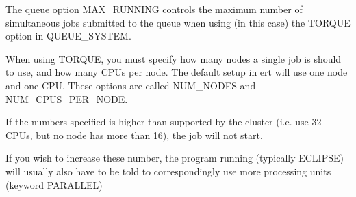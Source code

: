 \documentclass[a4paper,10pt,english]{sphinxmanual}
\begin{document}

The queue option MAX\_RUNNING controls the maximum number of simultaneous jobs
submitted to the queue when using (in this case) the TORQUE option in
QUEUE\_SYSTEM.

%
\begin{sphinxVerbatim}[commandchars=\\\{\}]
 
       
    
   
\end{sphinxVerbatim}


When using TORQUE, you must specify how many nodes a single job is should to
use, and how many CPUs per node. The default setup in ert will use one node and
one CPU. These options are called NUM\_NODES and NUM\_CPUS\_PER\_NODE.

If the numbers specified is higher than supported by the cluster (i.e. use 32
CPUs, but no node has more than 16), the job will not start.

If you wish to increase these number, the program running (typically ECLIPSE)
will usually also have to be told to correspondingly use more processing units
(keyword PARALLEL)

%
\begin{sphinxVerbatim}[commandchars=\\\{\}]
 
     
       
        
       
   
   
\end{sphinxVerbatim}
\end{document}
